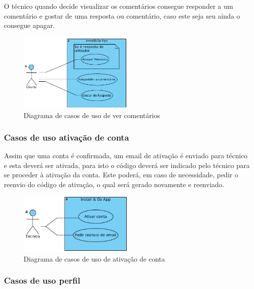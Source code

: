 O técnico quando decide visualizar os comentários consegue responder a 
um comentário e gostar de uma resposta ou comentário, caso este 
seja seu ainda o consegue apagar.

\begin{figure}[htb]
    \centering
    
    \includegraphics[width=0.5\textwidth]{images/diagramas/casos_de_uso/use_case_topic_comments.png}
    \caption{Diagrama de casos de uso de ver comentários}
    \label{fig:15}
\end{figure}

\subsubsection{Casos de uso ativação de conta}

Assim que uma conta é confirmada, um email de ativação é enviado para técnico e esta deverá ser ativada,
para isto o código deverá ser indicado pelo técnico para se proceder à ativação da conta. Este poderá,
em caso de necessidade, pedir o reenvio do código de ativação, o qual será gerado novamente e reenviado.

\begin{figure}[htb]
    \centering
    
    \includegraphics[width=0.5\textwidth]{images/diagramas/casos_de_uso/use_case_account_validation.png}
    \caption{Diagrama de casos de uso de ativação de conta}
    \label{fig:16}
\end{figure}

\subsubsection{Casos de uso perfil}

